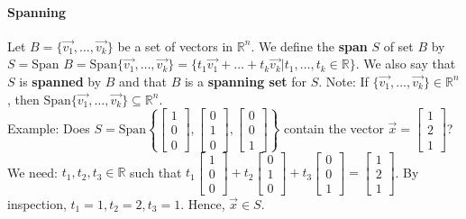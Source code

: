 \documentclass[10pt,letter]{article}
\begin{document}
\paragraph{Spanning} Let $B=\{\vec{v_1},\ldots,\vec{v_k}\}$ be a set of vectors in $\mathbb{R}^n$. We define the \textbf{span} $S$ of set $B$ by $S=\text{Span }B=\text{Span}\{\vec{v_1},\ldots,\vec{v_k}\}=\{t_1\vec{v_1}+\ldots+t_k\vec{v_k} | t_1,\ldots,t_k\in\mathbb{R}\}$. We also say that $S$ is \textbf{spanned} by $B$ and that $B$ is a \textbf{spanning set} for $S$. Note: If $\{\vec{v_1},\ldots,\vec{v_k}\}\in\mathbb{R}^n$, then $\text{Span}\{\vec{v_1},\ldots,\vec{v_k}\}\subseteq\mathbb{R}^n$. \\ 
Example: Does $S=\text{Span}\left\{\begin{bmatrix}1\\0\\0\end{bmatrix},\begin{bmatrix}0\\1\\0\end{bmatrix},\begin{bmatrix}0\\0\\1\end{bmatrix}\right\}$ contain the vector $\vec{x}=\begin{bmatrix}1\\2\\1\end{bmatrix}$? \\ We need: $t_1,t_2,t_3\in\mathbb{R}$ such that $t_1\begin{bmatrix}1\\0\\0\end{bmatrix}+t_2\begin{bmatrix}0\\1\\0\end{bmatrix}+t_3\begin{bmatrix}0\\0\\1\end{bmatrix}= \begin{bmatrix}1\\2\\1\end{bmatrix}$. By inspection, $t_1 = 1,t_2=2, t_3 =1$. Hence, $\vec{x}\in S$. 
\end{document}
